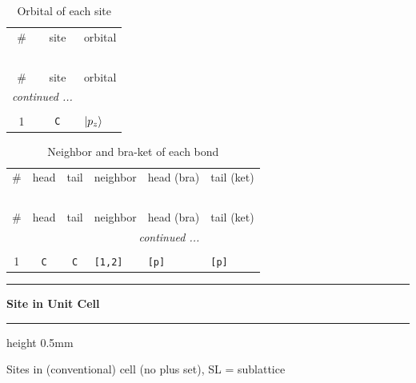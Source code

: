 \documentclass[fleqn,10pt,landscape]{jsarticle}
\begin{document}
\renewcommand{\arraystretch}{1.6}
\begin{longtable}[l]{ccl}
\captionsetup{justification=raggedright, singlelinecheck=off}
\caption{Orbital of each site}
 \\
 \hline \hline
\# & site & orbital \\ \hline \endfirsthead

\multicolumn{2}{l}{\tablename\ \thetable{}} \\
 \hline \hline
\# & site & orbital \\ \hline \endhead

 \hline \hline
\multicolumn{2}{r}{\footnotesize\it continued ...} \\ \endfoot

 \hline \hline
\multicolumn{2}{r}{} \\ \endlastfoot

1 & \texttt{C} & $\ket{p_{z}}$ \\
\end{longtable}
\renewcommand{\arraystretch}{1.6}
\begin{longtable}[l]{ccclll}
\captionsetup{justification=raggedright, singlelinecheck=off}
\caption{Neighbor and bra-ket of each bond}
 \\
 \hline \hline
\# & head & tail & neighbor & head (bra) & tail (ket) \\ \hline \endfirsthead

\multicolumn{5}{l}{\tablename\ \thetable{}} \\
 \hline \hline
\# & head & tail & neighbor & head (bra) & tail (ket) \\ \hline \endhead

 \hline \hline
\multicolumn{5}{r}{\footnotesize\it continued ...} \\ \endfoot

 \hline \hline
\multicolumn{5}{r}{} \\ \endlastfoot

1 & \texttt{C} & \texttt{C} & \texttt{[1,2]} & \texttt{[p]} & \texttt{[p]} \\
\end{longtable}
\vspace{5mm}
\noindent \rule[0.5mm]{5mm}{0.5mm}\hspace{3mm}\textbf{Site in Unit Cell}\hspace{3mm}\leaders\hrule height 0.5mm\hfill\kern0pt
\vspace{3mm}

\noindent Sites in (conventional) cell (no plus set), SL = sublattice
\end{document}
